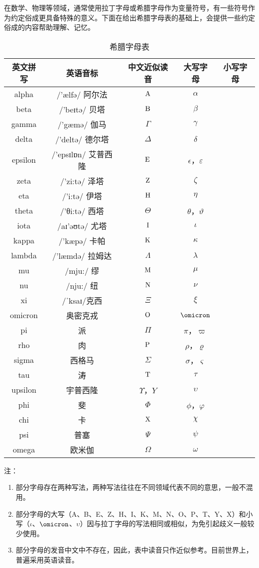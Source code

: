 \begin{issues}
\issueDraft
\end{issues}
在数学、物理等领域，通常使用拉丁字母或希腊字母作为变量符号，有一些符号作为约定俗成更具备特殊的意义。下面在给出希腊字母表的基础上，会提供一些约定俗成的内容帮助理解、记忆。

\begin{table}[ht]
\centering
\caption{希腊字母表}\label{tab_GreekL1}
\begin{tabular}{|c|c|c|c|c|}
\hline
英文拼写 & 英语音标 & 中文近似读音 & 大写字母 & 小写字母 \\
\hline
alpha & /'ælfə/   阿尔法 & ${\rm A}$ & $\alpha$ \\
\hline
beta & /'beɪtə/   贝塔 & ${\rm B}$ & $\beta$ \\
\hline
gamma & /'gæmə/   伽马 & $\Gamma$ & $\gamma$ \\
\hline
delta & /'deltə/   德尔塔 &$\Delta$ & $\delta$ \\
\hline
epsilon & /'epsɪlɒn/   艾普西隆 & ${\rm E}$ & $\epsilon$，$\varepsilon$ \\
\hline
zeta & /'zi:tə/   泽塔 & ${\rm Z}$ & $\zeta$ \\
\hline
eta & /'i:tə/   伊塔 & ${\rm H}$ & $\eta$ \\
\hline
theta & /'θi:tə/   西塔 & $\Theta$ & $\theta$，$\vartheta$ \\
\hline
iota & /aɪ'əʊtə/   尤塔 & ${\rm I}$ & $\iota$ \\
\hline
kappa & /'kæpə/   卡帕 & ${\rm K}$ & $\kappa$ \\
\hline
lambda & /'læmdə/   拉姆达 &$\Lambda$ & $\lambda$ \\
\hline
mu & /mju:/   缪 & ${\rm M}$ & $\mu$ \\
\hline
nu & /nju:/   纽 & ${\rm N}$ & $\nu$ \\
\hline
xi & /ˈksaɪ/克西 &$\Xi$ & $\xi$ \\
\hline
omicron & 奥密克戎 & ${\rm O}$ & $\omicron$ \\
\hline
pi & 派 &$\Pi$ & $\pi$，$\varpi$ \\
\hline
rho & 肉 & ${\rm P}$ & $\rho$，$\varrho$ \\
\hline
sigma & 西格马 &$\Sigma$ & $\sigma$，$\varsigma$ \\
\hline
tau & 涛 & ${\rm T}$ & $\tau$ \\
\hline
upsilon & 宇普西隆 & $\Upsilon$，${Y}$ & $\upsilon$ \\
\hline
phi & 斐 &$\Phi$ & $\phi$，$\varphi$ \\
\hline
chi & 卡 & ${\rm X}$ & $\chi$ \\
\hline
psi & 普塞 & $\Psi$ & $\psi$ \\
\hline
omega & 欧米伽 & $\Omega$ & $\omega$ \\
\hline
\end{tabular}
\end{table}

注：
\begin{enumerate}
\item 部分字母存在两种写法，两种写法往往在不同领域代表不同的意思，一般不混用。
\item 部分字母的大写（A、B、E、Z、H、I、K、M、N、O、P、T、Y、X）和小写（$\iota$、$\omicron$、$\upsilon$）因与拉丁字母的写法相同或相似，为免引起歧义一般较少使用。
\item 部分字母的发音中文中不存在，因此，表中读音只作近似参考。目前世界上，普遍采用英语读音。
\end{enumerate}


